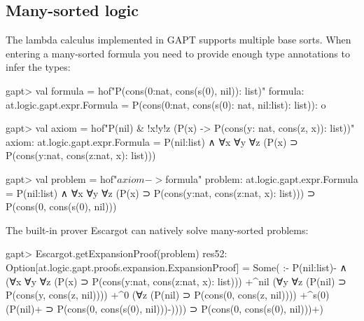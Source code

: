 \documentclass[a4paper,11pt]{article}
\begin{document}
\subsection{Many-sorted logic}\label{sec:many_sorted}

The lambda calculus implemented in GAPT supports multiple base sorts.  When
entering a many-sorted formula you need to provide enough type annotations to
infer the types:
\begin{clilisting}
gapt> val formula = hof"P(cons(0:nat, cons(s(0), nil)): list)"
formula: at.logic.gapt.expr.Formula = P(cons(0:nat, cons(s(0): nat, nil:list): list)): o

gapt> val axiom = hof"P(nil) & !x!y!z (P(x) -> P(cons(y: nat, cons(z, x)): list))"
axiom: at.logic.gapt.expr.Formula = P(nil:list) ∧ ∀x ∀y ∀z (P(x) ⊃ P(cons(y:nat, cons(z:nat, x): list)))

gapt> val problem = hof"$axiom -> $formula"
problem: at.logic.gapt.expr.Formula =
P(nil:list) ∧ ∀x ∀y ∀z (P(x) ⊃ P(cons(y:nat, cons(z:nat, x): list))) ⊃
  P(cons(0, cons(s(0), nil)))

\end{clilisting}

The built-in prover Escargot can natively solve many-sorted problems:
\begin{clilisting}
gapt> Escargot.getExpansionProof(problem)
res52: Option[at.logic.gapt.proofs.expansion.ExpansionProof] =
Some(
:-
P(nil:list)- ∧
    (∀x ∀y ∀z (P(x) ⊃ P(cons(y:nat, cons(z:nat, x): list)))
      +^{nil}
        (∀y ∀z (P(nil) ⊃ P(cons(y, cons(z, nil))))
          +^{0}
            (∀z (P(nil) ⊃ P(cons(0, cons(z, nil))))
            +^{s(0)} (P(nil)+ ⊃ P(cons(0, cons(s(0), nil)))-)))) ⊃
  P(cons(0, cons(s(0), nil)))+)

\end{clilisting}
\end{document}

